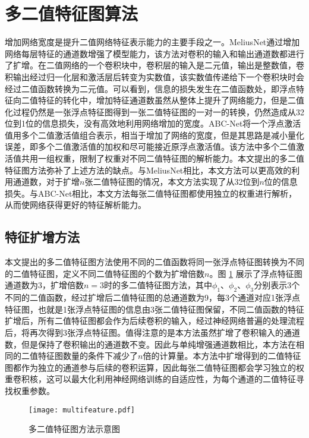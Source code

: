 \section{多二值特征图算法}

增加网络宽度是提升二值网络特征表示能力的主要手段之一。MeliusNet\cite{meliusnet}通过增加网络每层特征的通道数增强了模型能力，该方法对卷积的输入和输出通道数都进行了扩增。在二值网络的一个卷积块中，卷积层的输入是二元值，输出是整数值，卷积输出经过归一化层和激活层后转变为实数值，该实数值传递给下一个卷积块时会经过二值函数转换为二元值。可以看到，信息的损失发生在二值函数处，即浮点特征向二值特征的转化中，增加特征通道数虽然从整体上提升了网络能力，但是二值化过程仍然是一张浮点特征图得到一张二值特征图的一对一的转换，仍然造成从32位到1位的信息损失，没有高效地利用网络增加的宽度。ABC-Net\cite{abcnet}将一个浮点激活值用多个二值激活值组合表示，相当于增加了网络的宽度，但是其思路是减小量化误差，即多个二值激活值的加权和尽可能接近原浮点激活值。该方法中多个二值激活值共用一组权重，限制了权重对不同二值特征图的解析能力。本文提出的多二值特征图方法弥补了上述方法的缺点。与MeliusNet相比，本文方法可以更高效的利用通道数，对于扩增$n$张二值特征图的情况，本文方法实现了从32位到$n$位的信息损失。与ABC-Net相比，本文方法每张二值特征图都使用独立的权重进行解析，从而使网络获得更好的特征解析能力。

\subsection{特征扩增方法}

本文提出的多二值特征图方法使用不同的二值函数将同一张浮点特征图转换为不同的二值特征图，定义不同二值特征图的个数为扩增倍数$n$。图 \ref{fig:multifeature} 展示了浮点特征图通道数为3，扩增倍数$n = 3$时的多二值特征图方法，其中$\phi_1$、$\phi_2$、$\phi_3$分别表示3个不同的二值函数，经过扩增后二值特征图的总通道数为9，每3个通道对应1张浮点特征图，也就是1张浮点特征图的信息由3张二值特征图保留，不同二值函数的特征扩增后，所有二值特征图都会作为后续卷积的输入，经过神经网络普遍的处理流程后，将再次得到3张浮点特征图。值得注意的是本方法虽然扩增了卷积输入的通道数，但是保持了卷积输出的通道数不变。因此与单纯增强通道数相比，本方法在相同的二值特征图数量的条件下减少了$n$倍的计算量。本方法中扩增得到的二值特征图都作为独立的通道参与后续的卷积运算，因此每张二值特征图都会学习独立的权重卷积核，这可以最大化利用神经网络训练的自适应性，为每个通道的二值特征寻找权重参数。

\begin{figure}[htb]
  \vspace{6pt}
  \centering
  \texttt{[image: multifeature.pdf]}
  \caption{多二值特征图方法示意图}
  \label{fig:multifeature}
\end{figure}

